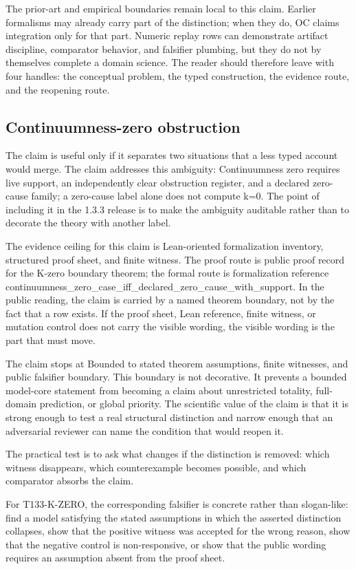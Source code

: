 The prior-art and empirical boundaries remain local to this claim. Earlier formalisms may already carry part of the distinction; when they do, OC claims integration only for that part. Numeric replay rows can demonstrate artifact discipline, comparator behavior, and falsifier plumbing, but they do not by themselves complete a domain science. The reader should therefore leave with four handles: the conceptual problem, the typed construction, the evidence route, and the reopening route.

\subsection{Continuumness-zero obstruction}
The claim is useful only if it separates two situations that a less typed account would merge. The claim addresses this ambiguity: Continuumness zero requires live support, an independently clear obstruction register, and a declared zero-cause family; a zero-cause label alone does not compute k=0. The point of including it in the 1.3.3 release is to make the ambiguity auditable rather than to decorate the theory with another label.

The evidence ceiling for this claim is Lean-oriented formalization inventory, structured proof sheet, and finite witness. The proof route is public proof record for the K-zero boundary theorem; the formal route is formalization reference continuumness\_zero\_case\_iff\_declared\_zero\_cause\_with\_support. In the public reading, the claim is carried by a named theorem boundary, not by the fact that a row exists. If the proof sheet, Lean reference, finite witness, or mutation control does not carry the visible wording, the visible wording is the part that must move.

The claim stops at Bounded to stated theorem assumptions, finite witnesses, and public falsifier boundary. This boundary is not decorative. It prevents a bounded model-core statement from becoming a claim about unrestricted totality, full-domain prediction, or global priority. The scientific value of the claim is that it is strong enough to test a real structural distinction and narrow enough that an adversarial reviewer can name the condition that would reopen it.

The practical test is to ask what changes if the distinction is removed: which witness disappears, which counterexample becomes possible, and which comparator absorbs the claim.

For T133-K-ZERO, the corresponding falsifier is concrete rather than slogan-like: find a model satisfying the stated assumptions in which the asserted distinction collapses, show that the positive witness was accepted for the wrong reason, show that the negative control is non-responsive, or show that the public wording requires an assumption absent from the proof sheet.

